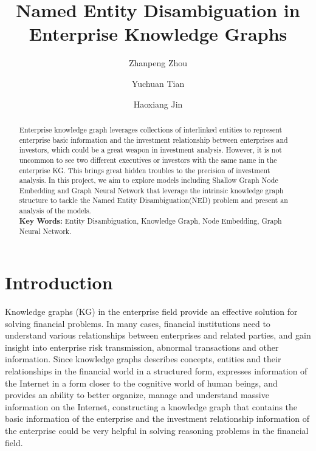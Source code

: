 \documentclass[sigconf, nonacm]{acmart}
\begin{document}
\title{Named Entity Disambiguation in Enterprise Knowledge Graphs}

\author{Zhanpeng Zhou}

\author{Yuchuan Tian}

\author{Haoxiang Jin}



\begin{abstract}

Enterprise knowledge graph leverages collections of interlinked entities to represent enterprise basic information and the investment relationship between enterprises and investors, which could be a great weapon in investment analysis. However, it is not uncommon to see two different executives or investors with the same name in the enterprise KG. This brings great hidden troubles to the precision of investment analysis. In this project, we aim to explore models including Shallow Graph Node Embedding and Graph Neural Network that leverage the intrinsic knowledge graph structure to tackle the Named Entity Disambiguation(NED) problem and present an analysis of the models.\\

\textbf{Key Words:} Entity Disambiguation, Knowledge Graph, Node Embedding, Graph Neural Network.
\end{abstract}

\maketitle

\section{Introduction}
Knowledge graphs (KG) in the enterprise field provide an effective solution for solving financial problems. In many cases, financial institutions need to understand various relationships between enterprises and related parties, and gain insight into enterprise risk transmission, abnormal transactions and other information. Since knowledge graphs describes concepts, entities and their relationships in the financial world in a structured form, expresses information of the Internet in a form closer to the cognitive world of human beings, and provides an ability to better organize, manage and understand massive information on the Internet, constructing a knowledge graph that contains the basic information of the enterprise and the investment relationship information of the enterprise could be very helpful in solving reasoning problems in the financial field.
\end{document}
